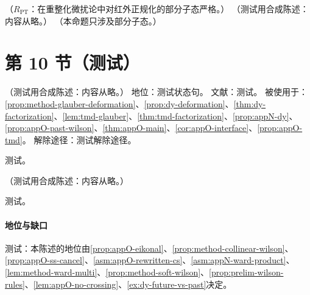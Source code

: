 \begin{proposition}\label{prop:appO-eikonal}
（$R_{\mathrm{PT}}$：在重整化微扰论中对红外正规化的部分子态严格。）
（测试用合成陈述：内容从略。）
（本命题只涉及部分子态。）
\end{proposition}

\section{第 10 节（测试）}\label{sec:appO-checklist}

\begin{assumption}\label{asm:appO-rewritten-cs}
（测试用合成陈述：内容从略。）
地位：测试状态句。
文献：测试。
被使用于：\cref{prop:method-glauber-deformation}、\cref{prop:dy-deformation}、\cref{thm:dy-factorization}、\cref{lem:tmd-glauber}、\cref{thm:tmd-factorization}、\cref{prop:appN-dy}、\cref{prop:appO-past-wilson}、\cref{thm:appO-main}、\cref{cor:appO-interface}、\cref{prop:appO-tmd}。
解除途径：测试解除途径。
\end{assumption}
\begin{proofsketch}测试。\end{proofsketch}

\begin{proposition}\label{prop:appO-past-wilson}
（测试用合成陈述：内容从略。）
\end{proposition}
\begin{proofsketch}测试。\end{proofsketch}
\paragraph{地位与缺口}测试：本陈述的地位由\cref{prop:appO-eikonal}、\cref{prop:method-collinear-wilson}、\cref{prop:appO-ss-cancel}、\cref{asm:appO-rewritten-cs}、\cref{asm:appN-ward-product}、\cref{lem:method-ward-multi}、\cref{prop:method-soft-wilson}、\cref{prop:prelim-wilson-rules}、\cref{lem:appO-no-crossing}、\cref{ex:dy-future-vs-past}决定。

